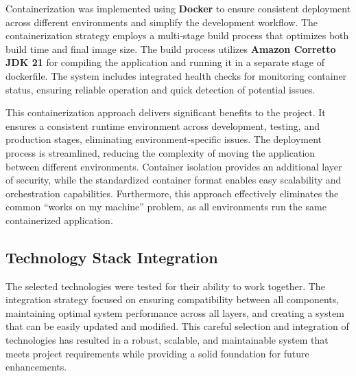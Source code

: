 Containerization was implemented using \textbf{Docker} to ensure consistent deployment across different environments and simplify the development workflow.
The containerization strategy employs a multi-stage build process that optimizes both build time and final image size.
The build process utilizes \textbf{Amazon Corretto JDK 21} for compiling the application and running it in a separate stage of dockerfile.
The system includes integrated health checks for monitoring container status, ensuring reliable operation and quick detection of potential issues.

This containerization approach delivers significant benefits to the project.
It ensures a consistent runtime environment across development, testing, and production stages, eliminating environment-specific issues.
The deployment process is streamlined, reducing the complexity of moving the application between different environments.
Container isolation provides an additional layer of security, while the standardized container format enables easy scalability and orchestration capabilities.
Furthermore, this approach effectively eliminates the common ``works on my machine'' problem, as all environments run the same containerized application.

\subsection{Technology Stack Integration}\label{subsec:integration}

The selected technologies were tested for their ability to work together.
The integration strategy focused on ensuring compatibility between all components, maintaining optimal system performance across all layers, and creating a system that can be easily updated and modified.
This careful selection and integration of technologies has resulted in a robust, scalable, and maintainable system that meets project requirements while providing a solid foundation for future enhancements.
